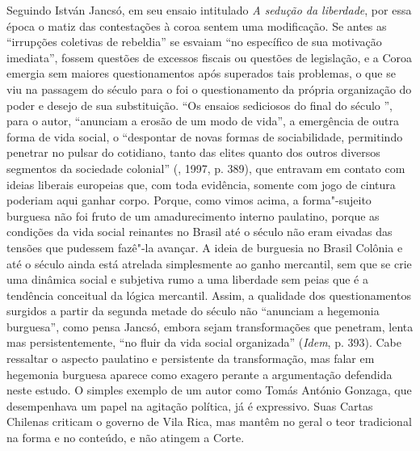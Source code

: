 Seguindo István Jancsó, em seu ensaio intitulado \emph{A sedução da
liberdade}, por essa época o matiz das contestações à coroa sentem uma
modificação. Se antes as ``irrupções coletivas de rebeldia'' se esvaiam
``no específico de sua motivação imediata'', fossem questões de excessos
fiscais ou questões de legislação, e a Coroa emergia sem maiores
questionamentos após superados tais problemas, o que se viu na passagem
do século  para o  foi o questionamento da própria organização
do poder e desejo de sua substituição. ``Os ensaios sediciosos do final
do século '', para o autor, ``anunciam a erosão de um modo de
vida'', a emergência de outra forma de vida social, o ``despontar de
novas formas de sociabilidade, permitindo penetrar no pulsar do
cotidiano, tanto das elites quanto dos outros diversos segmentos da
sociedade colonial'' (, 1997, p. 389), que entravam em contato com
ideias liberais europeias que, com toda evidência, somente com jogo de
cintura poderiam aqui ganhar corpo. Porque, como vimos acima, a
forma"-sujeito burguesa não foi fruto de um amadurecimento interno
paulatino, porque as condições da vida social reinantes no Brasil até o
século  não eram eivadas das tensões que pudessem fazê"-la avançar. A
ideia de burguesia no Brasil Colônia e até o século  ainda está
atrelada simplesmente ao ganho mercantil, sem que se crie uma dinâmica
social e subjetiva rumo a uma liberdade sem peias que é a tendência
conceitual da lógica mercantil. Assim, a qualidade dos questionamentos
surgidos a partir da segunda metade do século  não ``anunciam a
hegemonia burguesa'', como pensa Jancsó, embora sejam transformações que
penetram, lenta mas persistentemente, ``no fluir da vida social
organizada'' (\emph{Idem}, p. 393). Cabe ressaltar o aspecto paulatino
e persistente da transformação, mas falar em hegemonia burguesa aparece
como exagero perante a argumentação defendida neste estudo. O simples
exemplo de um autor como Tomás António Gonzaga, que desempenhava um
papel na agitação política, já é expressivo. Suas Cartas Chilenas
criticam o governo de Vila Rica, mas mantêm no geral o teor tradicional
na forma e no conteúdo, e não atingem a Corte.

